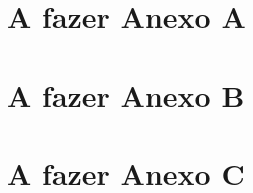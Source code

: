 \begin{anexosenv}


\partanexos

\chapter{A fazer Anexo A}

\chapter{A fazer Anexo B}


\chapter{A fazer Anexo C}



\end{anexosenv}
